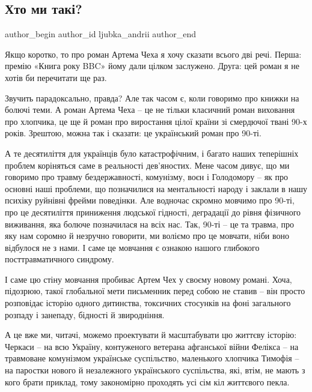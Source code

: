  
 
 
 
 
\subsection{Хто ми такі?}
\label{sec:06_01_2022.stz.news.ua.den.1.hto_my_taki}

\ifcmt
 author_begin
   author_id ljubka_andrii
 author_end
\fi

Якщо коротко, то про роман Артема Чеха я хочу сказати всього дві речі. Перша:
премію «Книга року BBC» йому дали цілком заслужено. Друга: цей роман я не хотів
би перечитати ще раз.

Звучить парадоксально, правда? Але так часом є, коли говоримо про книжки на
болючі теми. А роман Артема Чеха – це не тільки класичний роман виховання про
хлопчика, це ще й роман про виростання цілої країни зі смердючої твані 90-х
років. Зрештою, можна так і сказати: це український роман про 90-ті.

А те десятиліття для українців було катастрофічним, і багато наших теперішніх
проблем коріняться саме в реальності дев’яностих. Мене часом дивує, що ми
говоримо про травму бездержавності, комунізму, воєн і Голодомору – як про
основні наші проблеми, що позначилися на ментальності народу і заклали в нашу
психіку руйнівні фрейми поведінки. Але водночас скромно мовчимо про 90-ті, про
це десятиліття приниження людської гідності, деградації до рівня фізичного
виживання, яка болюче позначилася на всіх нас. Так, 90-ті – це та травма, про
яку нам соромно й незручно говорити, ми воліємо про це мовчати, ніби воно
відбулося не з нами. І саме це мовчання є ознакою нашого глибокого
посттравматичного синдрому.

І саме цю стіну мовчання пробиває Артем Чех у своєму новому романі. Хоча,
підозрюю, такої глобальної мети письменник перед собою не ставив – він просто
розповідає історію одного дитинства, токсичних стосунків на фоні загального
розпаду і занепаду, бідності й звиродніння.

А це вже ми, читачі, можемо проектувати й масштабувати цю життєву історію:
Черкаси – на всю Україну, контуженого ветерана афганської війни Фелікса – на
травмоване комунізмом українське суспільство, маленького хлопчика Тимофія – на
паростки нового й незалежного українського суспільства, які, втім, не мають з
кого брати приклад, тому закономірно проходять усі сім кіл життєвого пекла.

